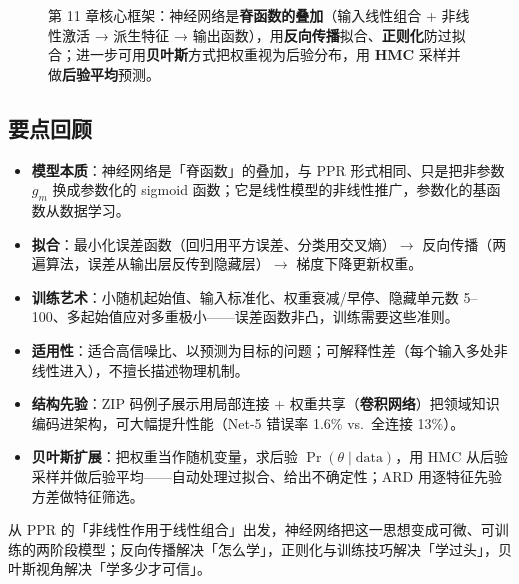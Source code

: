 \begin{figure}[H]
    \caption{第 11 章核心框架：神经网络是\textbf{脊函数的叠加}（输入线性组合 + 非线性激活 → 派生特征 → 输出函数），用\textbf{反向传播}拟合、\textbf{正则化}防过拟合；进一步可用\textbf{贝叶斯}方式把权重视为后验分布，用 \textbf{HMC} 采样并做\textbf{后验平均}预测。}
    \label{fig:11_summary}
\end{figure}

\subsection{要点回顾}

\begin{itemize}
\item \textbf{模型本质}：神经网络是「脊函数」的叠加，与 PPR 形式相同、只是把非参数 $g_m$ 换成参数化的 sigmoid 函数；它是线性模型的非线性推广，参数化的基函数从数据学习。
\item \textbf{拟合}：最小化误差函数（回归用平方误差、分类用交叉熵）$\to$ 反向传播（两遍算法，误差从输出层反传到隐藏层）$\to$ 梯度下降更新权重。
\item \textbf{训练艺术}：小随机起始值、输入标准化、权重衰减/早停、隐藏单元数 5--100、多起始值应对多重极小——误差函数非凸，训练需要这些准则。
\item \textbf{适用性}：适合高信噪比、以预测为目标的问题；可解释性差（每个输入多处非线性进入），不擅长描述物理机制。
\item \textbf{结构先验}：ZIP 码例子展示用局部连接 + 权重共享（\textbf{卷积网络}）把领域知识编码进架构，可大幅提升性能（Net-5 错误率 1.6\% vs.\ 全连接 13\%）。
\item \textbf{贝叶斯扩展}：把权重当作随机变量，求后验 $\Pr(\theta\mid\text{data})$，用 HMC 从后验采样并做后验平均——自动处理过拟合、给出不确定性；ARD 用逐特征先验方差做特征筛选。
\end{itemize}

\begin{remark}[一章主线]
从 PPR 的「非线性作用于线性组合」出发，神经网络把这一思想变成可微、可训练的两阶段模型；反向传播解决「怎么学」，正则化与训练技巧解决「学过头」，贝叶斯视角解决「学多少才可信」。
\end{remark}
